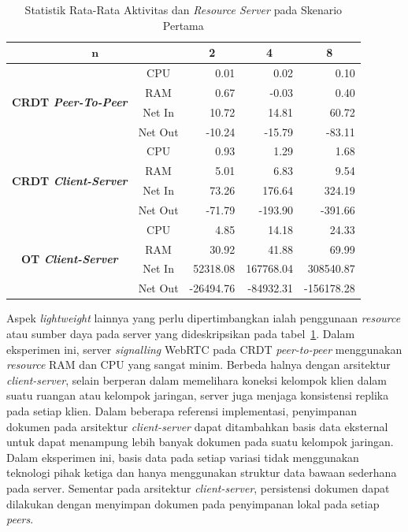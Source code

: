 \begin{table}[H]
 \caption{Statistik Rata-Rata Aktivitas dan \textit{Resource Server} pada Skenario Pertama}
 \label{tab:resource-server-1}

 \centering

\begin{tabular}{|cc|r|r|r|}
\hline
\multicolumn{2}{|c|}{$\boldsymbol{n}$} & \multicolumn{1}{c|}{\textbf{2}} & \multicolumn{1}{c|}{\textbf{4}} & \multicolumn{1}{c|}{\textbf{8}} \\ \hline
\multicolumn{1}{|c|}{\multirow{4}{*}{\textbf{CRDT \textit{Peer-To-Peer}}}} & CPU & 0.01 & 0.02 & 0.10 \\ \cline{2-5}
\multicolumn{1}{|c|}{} & RAM & 0.67 & -0.03 & 0.40 \\ \cline{2-5}
\multicolumn{1}{|c|}{} & Net In & 10.72 & 14.81 & 60.72 \\ \cline{2-5}
\multicolumn{1}{|c|}{} & Net Out & -10.24 & -15.79 & -83.11 \\ \hline
\multicolumn{1}{|c|}{\multirow{4}{*}{\textbf{CRDT \textit{Client-Server}}}} & CPU & 0.93 & 1.29 & 1.68 \\ \cline{2-5}
\multicolumn{1}{|c|}{} & RAM & 5.01 & 6.83 & 9.54 \\ \cline{2-5}
\multicolumn{1}{|c|}{} & Net In & 73.26 & 176.64 & 324.19 \\ \cline{2-5}
\multicolumn{1}{|c|}{} & Net Out & -71.79 & -193.90 & -391.66 \\ \hline
\multicolumn{1}{|c|}{\multirow{4}{*}{\textbf{OT \textit{Client-Server}}}} & CPU & 4.85 & 14.18 & 24.33 \\ \cline{2-5}
\multicolumn{1}{|c|}{} & RAM & 30.92 & 41.88 & 69.99 \\ \cline{2-5}
\multicolumn{1}{|c|}{} & Net In & 52318.08 & 167768.04 & 308540.87 \\ \cline{2-5}
\multicolumn{1}{|c|}{} & Net Out & -26494.76 & -84932.31 & -156178.28 \\ \hline
\end{tabular}
\end{table}

Aspek \textit{lightweight} lainnya yang perlu dipertimbangkan ialah penggunaan \textit{resource} atau sumber daya pada server yang dideskripsikan pada tabel~\ref{tab:resource-server-1}. Dalam eksperimen ini, server \textit{signalling} WebRTC pada CRDT \textit{peer-to-peer} menggunakan \textit{resource} RAM dan CPU yang sangat minim. Berbeda halnya dengan arsitektur \textit{client-server}, selain berperan dalam memelihara koneksi kelompok klien dalam suatu ruangan atau kelompok jaringan, server juga menjaga konsistensi replika pada setiap klien. Dalam beberapa referensi implementasi, penyimpanan dokumen pada arsitektur \textit{client-server} dapat ditambahkan basis data eksternal untuk dapat menampung lebih banyak dokumen pada suatu kelompok jaringan. Dalam eksperimen ini, basis data pada setiap variasi tidak menggunakan teknologi pihak ketiga dan hanya menggunakan struktur data bawaan sederhana pada server. Sementar pada arsitektur \textit{client-server}, persistensi dokumen dapat dilakukan dengan menyimpan dokumen pada penyimpanan lokal pada setiap \textit{peers}.

